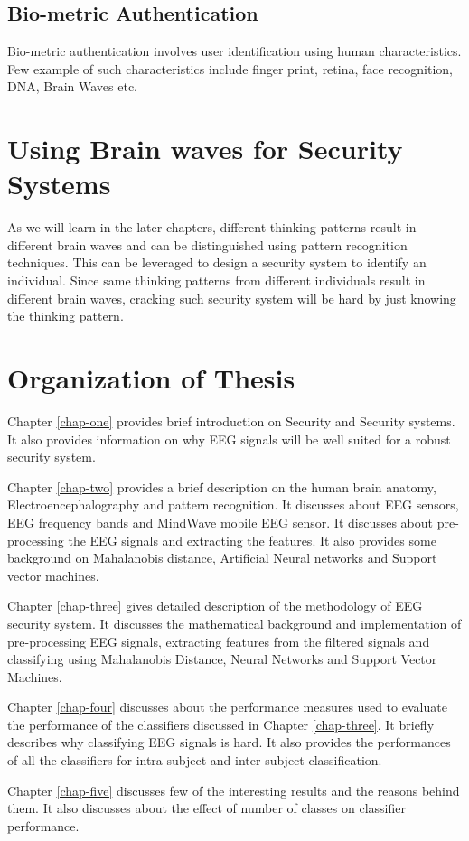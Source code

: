 \subsection{Bio-metric Authentication}
	Bio-metric authentication involves user identification using human characteristics. Few example of such characteristics include finger print, retina, face recognition, DNA, Brain Waves etc.

\section{Using Brain waves for Security Systems}
	As we will learn in the later chapters, different thinking patterns result in different brain waves and can be distinguished using pattern recognition techniques. This can be leveraged to design a security system to identify an individual. Since same thinking patterns from different individuals result in different brain waves, cracking such security system will be hard by just knowing the thinking pattern.


\section{Organization of Thesis}
	Chapter \ref{chap-one} provides brief introduction on Security and Security systems. It also provides information on why EEG signals will be well suited for a robust security system.

	Chapter \ref{chap-two} provides a brief description on the human brain anatomy, Electroencephalography and pattern recognition. It discusses about EEG sensors, EEG frequency bands and MindWave mobile EEG sensor. It discusses about pre-processing the EEG signals and extracting the features. It also provides some background on Mahalanobis distance, Artificial Neural networks and Support vector machines.

	Chapter \ref{chap-three} gives detailed description of the methodology of EEG security system. It discusses the mathematical background and implementation of pre-processing EEG signals, extracting features from the filtered signals and classifying using Mahalanobis Distance, Neural Networks and Support Vector Machines.

	Chapter \ref{chap-four} discusses about the performance measures used to evaluate the performance of the classifiers discussed in Chapter \ref{chap-three}. It briefly describes why classifying EEG signals is hard. It also provides the performances of all the classifiers for intra-subject and inter-subject classification.

	Chapter \ref{chap-five} discusses few of the interesting results and the reasons behind them. It also discusses about the effect of number of classes on classifier performance.